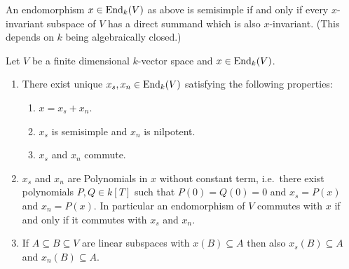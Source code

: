 \begin{rem}
 An endomorphism $x \in \operatorname{End}_k(V)$ as above is semisimple if and only if every $x$-invariant subspace of $V$ has a direct summand which is also $x$-invariant. (This depends on $k$ being algebraically closed.)
\end{rem}


\begin{thrm}\label{thrm: concrete Jordan decomposition}
 Let $V$ be a finite dimensional $k$-vector space and $x \in \operatorname{End}_k(V)$.
 \begin{enumerate}[leftmargin=*]
  \item
   There exist unique $x_s, x_n \in \operatorname{End}_k(V)$ satisfying the following properties:
   \begin{enumerate}
    \item
     $x = x_s + x_n$.
    \item
     $x_s$ is semisimple and $x_n$ is nilpotent.
    \item
     $x_s$ and $x_n$ commute.
   \end{enumerate}
  \item
   $x_s$ and $x_n$ are Polynomials in $x$ without constant term, i.e.\ there exist polynomials $P,Q \in k[T]$ such that $P(0) = Q(0) = 0$ and $x_s = P(x)$ and $x_n = P(x)$. In particular an endomorphism of $V$ commutes with $x$ if and only if it commutes with $x_s$ and $x_n$.
  \item
   If $A \subseteq B \subseteq V$ are linear subspaces with $x(B) \subseteq A$ then also $x_s(B) \subseteq A$ and $x_n(B) \subseteq A$.
 \end{enumerate}
\end{thrm}
